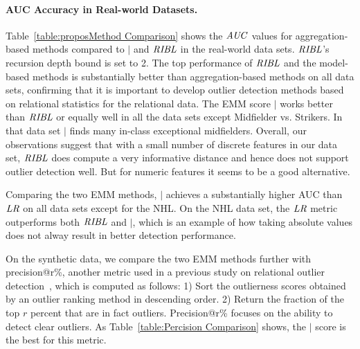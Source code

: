 {		\paragraph{AUC Accuracy in Real-world Datasets.}
Table~\ref{table:proposMethod Comparison} shows the $\it{AUC}$ values
 for aggregation-based methods compared to $\mid$ and $\it{RIBL}$ in the real-world data sets.  $\it{RIBL}$'s recursion depth bound is set to 2. The top performance of $\it{RIBL}$ and the model-based methods is substantially better than aggregation-based methods on all data sets,  confirming that it is important to develop outlier detection methods based on relational statistics for the relational data. The  EMM score $\mid$ works better than $\it{RIBL}$ or equally well in all the data sets except Midfielder vs. Strikers. In that data set $\mid$ finds many in-class exceptional midfielders. 
 Overall, our observations suggest that with a small number of discrete features in our data set, $\it{RIBL}$ does compute a very informative distance and hence does not support outlier detection well. But for numeric features it seems to be a good alternative.

Comparing the two EMM methods,  $\mid$ achieves a substantially higher AUC than $\it{LR}$ on all data sets except for the NHL. On the NHL data set, the $\it{LR}$ metric outperforms both $\it{RIBL}$ and $\mid$, which is an example of how taking absolute values does not alway result in better detection performance.   

On the synthetic data, we compare the two EMM methods further  with precision@r\%, another metric used in a previous study on relational outlier detection~\citep{Gao2010}, which is computed as follows: 1) Sort the outlierness scores obtained by an outlier ranking method in descending order. 2) Return the fraction of the top $r$ percent that are in fact outliers. Precision@r\% focuses on the ability to detect clear outliers. As Table~\ref{table:Percision Comparison} shows, the $\mid$ score is the best for this metric.

	\begin{table}
		\begin{subtable}
			
			\centering
\end{subtable}
\end{table}}
